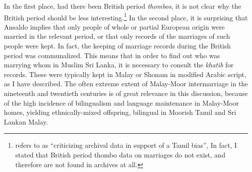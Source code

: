 In the first place, had there been British period \textit{thombos}, it is not clear why the British period should be less interesting.\footnote{\citet{Ansaldo2011b}
 refers to \citet{Slomanson2011} as ``criticizing archival data in support of a Tamil bias'', In fact, I stated that British period thombo data on marriages do not exist, and therefore are not found in archives at all.
} 
In the second place, it is surprising that Ansaldo implies that only people of whole or partial European origin were married in the relevant period, or that only records of the marriages of such people were kept.  In fact, the keeping of marriage records during the British period was communalized. This means that in order to find out who was marrying whom in Muslim Sri Lanka, it is necessary to consult the \textit{khatib} for records. These were typically kept in Malay or Shonam in modified Arabic script, as I have described. The often extreme extent of Malay-Moor intermarriage in the nineteenth and twentieth centuries is of great relevance in this discussion, because of the high incidence of bilingualism and language maintenance in Malay-Moor homes, yielding ethnically-mixed offspring, bilingual in Moorish Tamil and Sri Lankan Malay. 

